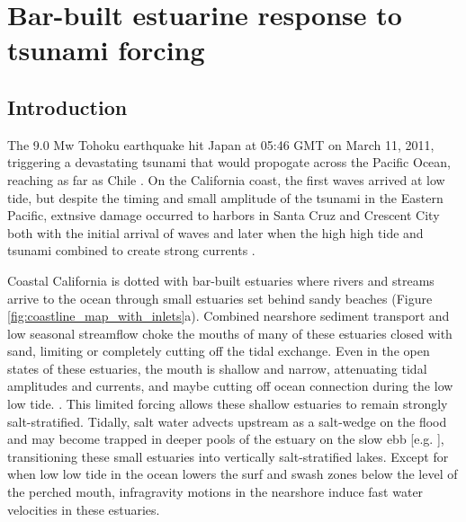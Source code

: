 \chapter{Bar-built estuarine response to tsunami forcing}
\label{chTsunami}




\section{Introduction}

The 9.0 Mw Tohoku earthquake hit Japan at 05:46 GMT on March 11, 2011,
triggering a devastating tsunami that would propogate across the Pacific
Ocean, reaching as far as Chile \citep{mori_ea,lagos_haro_agu}. On
the California coast, the first waves arrived at low tide, but despite
the timing and small amplitude of the tsunami in the Eastern Pacific,
extnsive damage occurred to harbors in Santa Cruz and Crescent City
both with the initial arrival of waves and later when the high high
tide and tsunami combined to create strong currents \citep{Wilsonetal2012}.

Coastal California is dotted with bar-built estuaries where rivers
and streams arrive to the ocean through small estuaries set behind
sandy beaches (Figure \ref{fig:coastline_map_with_inlets}a). Combined
nearshore sediment transport and low seasonal streamflow choke the
mouths of many of these estuaries closed with sand, limiting or completely
cutting off the tidal exchange. Even in the open states of these estuaries,
the mouth is shallow and narrow, attenuating tidal amplitudes and
currents, and maybe cutting off ocean connection during the low low
tide. \citep{williams_stacey_inprep}. This limited forcing allows
these shallow estuaries to remain strongly salt-stratified. Tidally,
salt water advects upstream as a salt-wedge on the flood and may become
trapped in deeper pools of the estuary on the slow ebb {[}e.g. \citealp{Largier_taljaard1991,ranasinghe_pattiaratchi99}{]},
transitioning these small estuaries into vertically salt-stratified
lakes. Except for when low low tide in the ocean lowers the surf and
swash zones below the level of the perched mouth, infragravity motions
in the nearshore induce fast water velocities in these estuaries\citep{williams_stacey_inprep}. 



